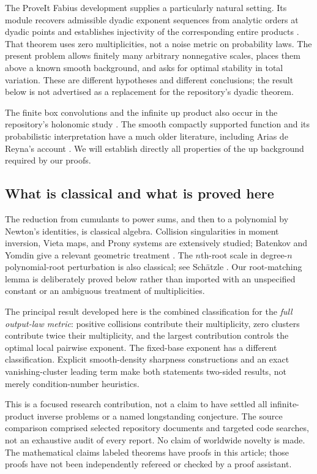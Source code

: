 \documentclass[11pt,a4paper]{article}
\numberwithin{equation}{section}
\theoremstyle{definition}
\theoremstyle{remark}
\begin{document}
The ProveIt Fabius development supplies a particularly natural setting.  Its
module  recovers admissible dyadic
exponent sequences from analytic orders at dyadic points and establishes
injectivity of the corresponding entire products \cite{RepoIdent}.  That theorem
uses zero multiplicities, not a noise metric on probability laws.  The present
problem allows finitely many arbitrary nonnegative scales, places them above a
known smooth background, and asks for optimal stability in total variation.
These are different hypotheses and different conclusions; the result below is
not advertised as a replacement for the repository's dyadic theorem.

The finite box convolutions and the infinite up product also occur in the
repository's holonomic study \cite{RepoHolonomic}.  The smooth compactly supported
function and its probabilistic interpretation have a much older literature,
including Arias de Reyna's account \cite{Arias}.  We will establish directly all
properties of the up background required by our proofs.

\subsection{What is classical and what is proved here}
The reduction from cumulants to power sums, and then to a polynomial by Newton's
identities, is classical algebra.  Collision singularities in moment inversion,
Vieta maps, and Prony systems are extensively studied; Batenkov and Yomdin give
a relevant geometric treatment \cite{Prony}.  The $n$th-root scale in degree-$n$
polynomial-root perturbation is also classical; see Sch\"atzle \cite{Schaetzle}.
Our root-matching lemma is deliberately proved below rather than imported with
an unspecified constant or an ambiguous treatment of multiplicities.

The principal result developed here is the combined classification for the
\emph{full output-law metric}: positive collisions contribute their multiplicity,
zero clusters contribute twice their multiplicity, and the largest contribution
controls the optimal local pairwise exponent.  The fixed-base exponent has a
different classification.  Explicit smooth-density sharpness constructions and
an exact vanishing-cluster leading term make both statements two-sided results,
not merely condition-number heuristics.

This is a focused research contribution, not a claim to have settled all
infinite-product inverse problems or a named longstanding conjecture.  The source
comparison comprised selected repository documents and targeted code searches,
not an exhaustive audit of every report.  No claim of worldwide novelty is made.
The mathematical claims labeled theorems have proofs in this article; those
proofs have not been independently refereed or checked by a proof assistant.
\end{document}

